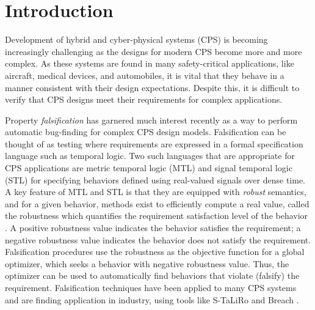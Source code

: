 \section{Introduction} \label{sec:introduction}

Development of hybrid and cyber-physical systems (CPS) is becoming
increasingly challenging as the designs for modern CPS become more and
more complex.  As these systems are found in many safety-critical
applications, like aircraft, medical devices, and automobiles, it is
vital that they behave in a manner consistent with their
design expectations. Despite this, it is difficult to verify that CPS
designs meet their requirements for complex applications.


Property \emph{falsification} has garnered much interest recently as a
way to perform automatic bug-finding for complex CPS design
models. Falsification can be thought of as testing where requirements are expressed 
in a formal specification language such as temporal logic.
Two such
languages that are appropriate for CPS applications are metric
temporal logic (MTL) and signal temporal logic (STL)
\cite{Koymans1990,MalerN04} for specifying behaviors defined
using real-valued signals over dense time. A key feature of MTL and
STL is that they are equipped with \emph{robust} semantics, and for a given behavior, methods exist to efficiently compute a
real value, called the robustness which quantifies the requirement satisfaction level of the behavior
\cite{FainekosP06fates,DonzeM10}. A positive robustness value
indicates the behavior satisfies the requirement; a negative
robustness value indicates the behavior does not satisfy the
requirement. Falsification procedures use the robustness as the objective function
for a global optimizer, which seeks a
behavior with negative robustness value. Thus, the optimizer can
be used to automatically find behaviors that violate (falsify) the
requirement. Falsification techniques have been applied to many CPS
systems and are finding application in industry, using tools like
S-TaLiRo and Breach \cite{TaliroLFS11,BreachCAV10}. 

